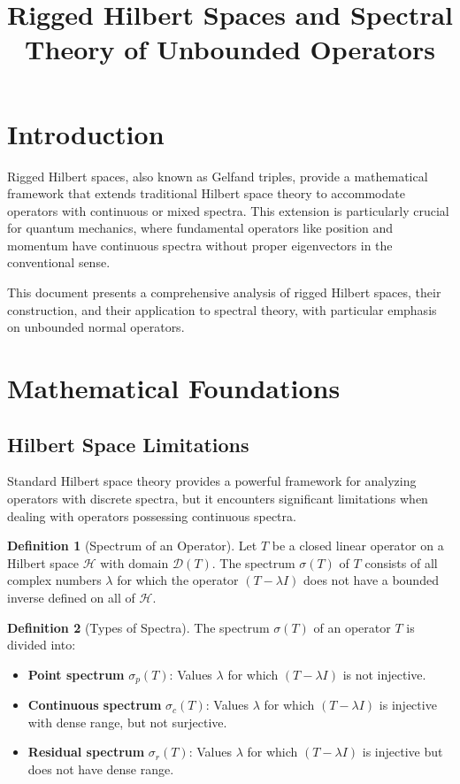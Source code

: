\documentclass[12pt,a4paper]{article}
\title{\Huge \textbf{Rigged Hilbert Spaces and Spectral Theory of Unbounded Operators}}
\author{}
\date{}
\theoremstyle{definition}
\newtheorem{definition}{Definition}
\begin{document}
\maketitle
\tableofcontents
\newpage

\section{Introduction}
Rigged Hilbert spaces, also known as Gelfand triples, provide a mathematical framework that extends traditional Hilbert space theory to accommodate operators with continuous or mixed spectra. This extension is particularly crucial for quantum mechanics, where fundamental operators like position and momentum have continuous spectra without proper eigenvectors in the conventional sense.

This document presents a comprehensive analysis of rigged Hilbert spaces, their construction, and their application to spectral theory, with particular emphasis on unbounded normal operators.

\section{Mathematical Foundations}

\subsection{Hilbert Space Limitations}

Standard Hilbert space theory provides a powerful framework for analyzing operators with discrete spectra, but it encounters significant limitations when dealing with operators possessing continuous spectra.

\begin{definition}[Spectrum of an Operator]
Let $T$ be a closed linear operator on a Hilbert space $\mathcal{H}$ with domain $\mathcal{D}(T)$. The spectrum $\sigma(T)$ of $T$ consists of all complex numbers $\lambda$ for which the operator $(T - \lambda I)$ does not have a bounded inverse defined on all of $\mathcal{H}$.
\end{definition}

\begin{definition}[Types of Spectra]
The spectrum $\sigma(T)$ of an operator $T$ is divided into:
\begin{itemize}
    \item \textbf{Point spectrum} $\sigma_p(T)$: Values $\lambda$ for which $(T - \lambda I)$ is not injective.
    \item \textbf{Continuous spectrum} $\sigma_c(T)$: Values $\lambda$ for which $(T - \lambda I)$ is injective with dense range, but not surjective.
    \item \textbf{Residual spectrum} $\sigma_r(T)$: Values $\lambda$ for which $(T - \lambda I)$ is injective but does not have dense range.
\end{itemize}
\end{definition}
\end{document}

